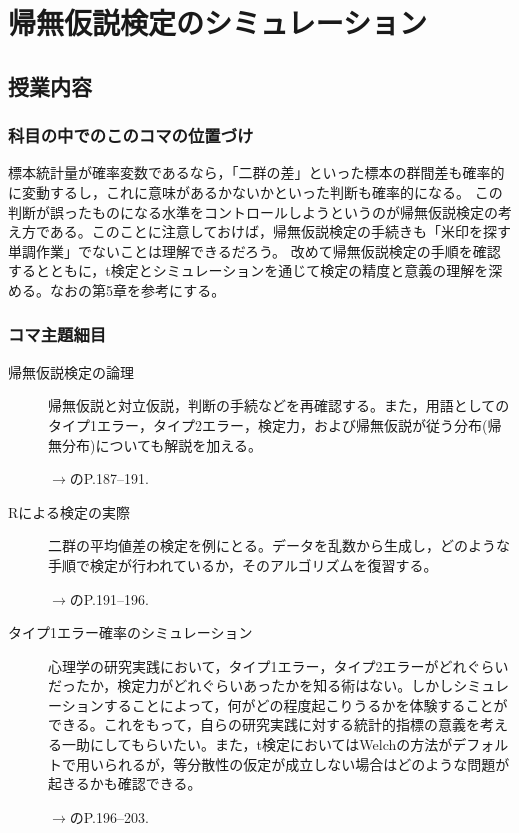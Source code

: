 \section{帰無仮説検定のシミュレーション}
\subsection{授業内容}
\subsubsection{科目の中でのこのコマの位置づけ}
標本統計量が確率変数であるなら，「二群の差」といった標本の群間差も確率的に変動するし，これに意味があるかないかといった判断も確率的になる。
この判断が誤ったものになる水準をコントロールしようというのが帰無仮説検定の考え方である。このことに注意しておけば，帰無仮説検定の手続きも「米印を探す単調作業」でないことは理解できるだろう。
改めて帰無仮説検定の手順を確認するとともに，t検定とシミュレーションを通じて検定の精度と意義の理解を深める。なお\textcite{kosugi2023}の第5章を参考にする。
\subsubsection{コマ主題細目}
\begin{description}
	\item[帰無仮説検定の論理] 帰無仮説と対立仮説，判断の手続などを再確認する。また，用語としてのタイプ1エラー，タイプ2エラー，検定力，および帰無仮説が従う分布(帰無分布)についても解説を加える。
		\begin{flushright}
			$\to$\textcite{kosugi2023}のP.187--191.
		\end{flushright}
	\item[Rによる検定の実際] 二群の平均値差の検定を例にとる。データを乱数から生成し，どのような手順で検定が行われているか，そのアルゴリズムを復習する。
		\begin{flushright}
			$\to$\textcite{kosugi2023}のP.191--196.
		\end{flushright}
	\item[タイプ1エラー確率のシミュレーション] 心理学の研究実践において，タイプ1エラー，タイプ2エラーがどれぐらいだったか，検定力がどれぐらいあったかを知る術はない。しかしシミュレーションすることによって，何がどの程度起こりうるかを体験することができる。これをもって，自らの研究実践に対する統計的指標の意義を考える一助にしてもらいたい。また，t検定においてはWelchの方法がデフォルトで用いられるが，等分散性の仮定が成立しない場合はどのような問題が起きるかも確認できる。
		\begin{flushright}
			$\to$\textcite{kosugi2023}のP.196--203.
		\end{flushright}
\end{description}
